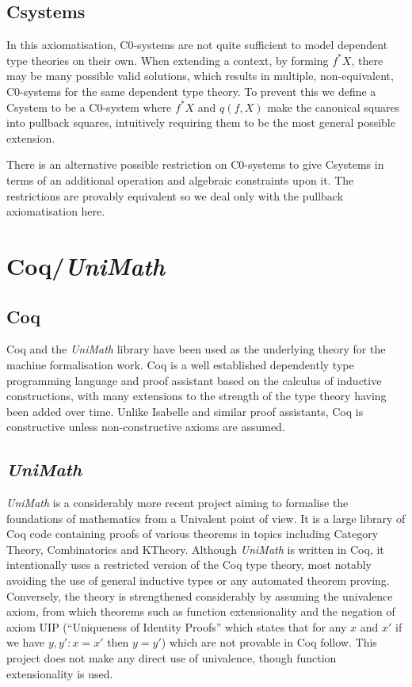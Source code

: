 \subsection{Csystems}
In this axiomatisation, C0-systems are not quite sufficient to model dependent
type theories on their own. When extending a context, by forming $f^*X$, there
may be many possible valid solutions, which results in multiple, non-equivalent,
C0-systems for the same dependent type theory. To prevent this we define a
Csystem to be a C0-system where $f^*X$ and $q(f, X)$ make the canonical squares
into pullback squares, intuitively requiring them to be the most general
possible extension.

There is an alternative possible restriction on C0-systems to give Csystems in
terms of an additional operation and algebraic constraints upon it. The
restrictions are provably equivalent \cite{voevodskycsystems} so we deal only
with the pullback axiomatisation here.

\section{Coq/\textit{UniMath}}
\subsection{Coq}
Coq\cite{coq} and the \textit{UniMath} library\cite{UniMath} have been used as
the underlying theory for the machine formalisation work. Coq is a well
established dependently type programming language and proof assistant based on
the calculus of inductive constructions, with many extensions to the strength of
the type theory having been added over time. Unlike Isabelle\cite{isabelle} and
similar proof assistants, Coq is constructive unless non-constructive axioms are
assumed.

\subsection{\textit{UniMath}}
\textit{UniMath}\cite{UniMath} is a considerably more recent project aiming to
formalise the foundations of mathematics from a Univalent\cite{univalence} point
of view. It is a large library of Coq code containing proofs of various theorems
in topics including Category Theory, Combinatorics and KTheory. Although
\textit{UniMath} is written in Coq, it intentionally uses a restricted version
of the Coq type theory, most notably avoiding the use of general inductive types
or any automated theorem proving. Conversely, the theory is strengthened
considerably by assuming the univalence axiom\cite{univalence}, from which
theorems such as function extensionality and the negation of axiom UIP
(``Uniqueness of Identity Proofs'' which states that for any $x$ and $x'$ if we
have $y, y' : x=x'$ then $y=y'$) which are not provable in Coq follow. This
project does not make any direct use of univalence, though function
extensionality is used.

